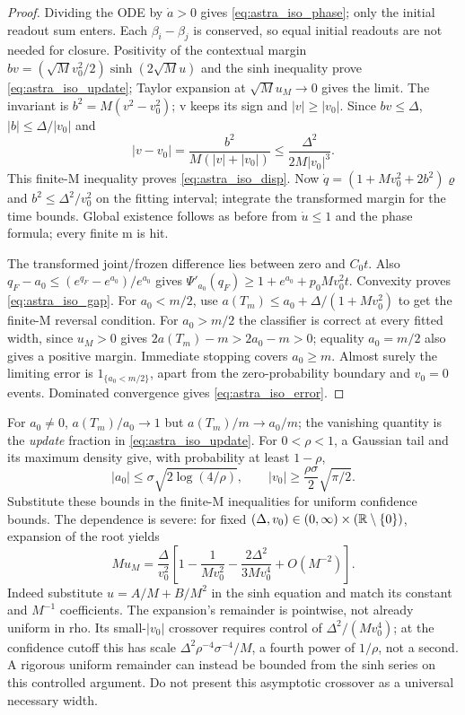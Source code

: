 \begin{proof}
Dividing the ODE by $\dot a>0$ gives
\eqref{eq:astra_iso_phase}; only the initial readout sum enters.
Each $\beta_i-\beta_j$ is conserved, so equal initial readouts are not
needed for closure. Positivity of the contextual margin
$b v=(\sqrt Mv_0^2/2)\sinh(2\sqrt M u)$ and the sinh inequality
prove \eqref{eq:astra_iso_update}; Taylor expansion at
$\sqrt M u_M\to0$ gives the limit. The invariant is
$b^2=M(v^2-v_0^2)$; v keeps its sign and $|v|\ge|v_0|$.
Since $bv\le\Delta$, $|b|\le\Delta/|v_0|$ and
\[
 |v-v_0|=\frac{b^2}{M(|v|+|v_0|)}
 \le\frac{\Delta^2}{2M|v_0|^3}.
\]
This finite-M inequality proves \eqref{eq:astra_iso_disp}.
Now $\dot q=(1+Mv_0^2+2b^2)\varrho$ and
$b^2\le\Delta^2/v_0^2$ on the fitting interval; integrate the
transformed margin for the time bounds. Global existence follows as
before from $\dot u\le1$ and the phase formula; every finite m is hit.

The transformed joint/frozen difference lies between zero and $C_0t$.
Also $q_F-a_0\le(e^{q_F}-e^{a_0})/e^{a_0}$ gives
$\Psi'_{a_0}(q_F)\ge1+e^{a_0}+p_0Mv_0^2t$.
Convexity proves \eqref{eq:astra_iso_gap}. For $a_0<m/2$, use
$a(T_m)\le a_0+\Delta/(1+Mv_0^2)$ to get the finite-M reversal
condition. For $a_0>m/2$ the classifier is correct at every fitted
width, since $u_M>0$ gives $2a(T_m)-m>2a_0-m>0$; equality
$a_0=m/2$ also gives a positive margin. Immediate stopping covers
$a_0\ge m$. Almost surely the limiting error is
$1_{\{a_0<m/2\}}$, apart from the zero-probability boundary and
$v_0=0$ events. Dominated convergence gives \eqref{eq:astra_iso_error}.
\end{proof}

\begin{remark}
For $a_0\ne0$, $a(T_m)/a_0\to1$ but $a(T_m)/m\to a_0/m$;
the vanishing quantity is the \emph{update} fraction in
\eqref{eq:astra_iso_update}. For $0<\rho<1$, a Gaussian tail and its
maximum density give, with probability at least $1-\rho$,
\[
 |a_0|\le\sigma\sqrt{2\log(4/\rho)},\qquad
 |v_0|\ge\frac{\rho\sigma}{2}\sqrt{\pi/2}.
\]
Substitute these bounds in the finite-M inequalities for uniform
confidence bounds. The dependence is severe: for fixed
$(\Delta,v_0)\in(0,\infty)\times(\mathbb{R}\setminus\{0\})$, expansion
of the root yields
\[
 Mu_M=\frac{\Delta}{v_0^2}\left[
 1-\frac1{Mv_0^2}-\frac{2\Delta^2}{3Mv_0^4}+O(M^{-2})\right].
\]
Indeed substitute $u=A/M+B/M^2$ in the sinh equation and match its
constant and $M^{-1}$ coefficients. The expansion's remainder is
pointwise, not already uniform in rho. Its small-$|v_0|$ crossover
requires control of $\Delta^2/(Mv_0^4)$; at the confidence cutoff this
has scale $\Delta^2\rho^{-4}\sigma^{-4}/M$, a fourth power of
$1/\rho$, not a second. A rigorous uniform remainder can instead be
bounded from the sinh series on this controlled argument. Do not
present this asymptotic crossover as a universal necessary width.
\end{remark}

